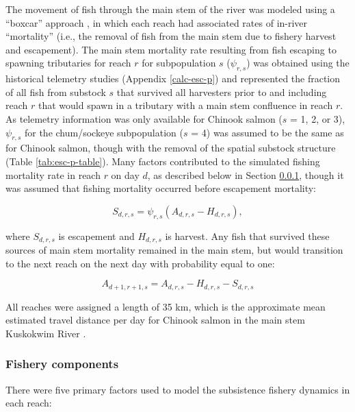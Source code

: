 \documentclass[12pt,]{book}
\theoremstyle{definition}
\theoremstyle{definition}
\theoremstyle{definition}
\theoremstyle{remark}
\begin{document}
The movement of fish through the main stem of the river was modeled
using a ``boxcar'' approach \citep{walters-martell-2004}, in which each
reach had associated rates of in-river ``mortality'' (i.e., the removal
of fish from the main stem due to fishery harvest and escapement). The
main stem mortality rate resulting from fish escaping to spawning
tributaries for reach \(r\) for subpopulation \(s\) (\(\psi_{r,s}\)) was
obtained using the historical telemetry studies (Appendix
\ref{calc-esc-p}) and represented the fraction of all fish from substock
\(s\) that survived all harvesters prior to and including reach \(r\)
that would spawn in a tributary with a main stem confluence in reach
\(r\). As telemetry information was only available for Chinook salmon
(\(s\) = 1, 2, or 3), \(\psi_{r,s}\) for the chum/sockeye subpopulation
(\(s\) = 4) was assumed to be the same as for Chinook salmon, though
with the removal of the spatial substock structure (Table
\ref{tab:esc-p-table}). Many factors contributed to the simulated
fishing mortality rate in reach \(r\) on day \(d\), as described below
in Section \ref{om-fishery}, though it was assumed that fishing
mortality occurred before escapement mortality:

\begin{equation}
  S_{d,r,s}=\psi_{r,s} \left(A_{d,r,s} - H_{d,r,s} \right),
  \label{eq:get-esc}
\end{equation}

\noindent
where \(S_{d,r,s}\) is escapement and \(H_{d,r,s}\) is harvest. Any fish
that survived these sources of main stem mortality remained in the main
stem, but would transition to the next reach on the next day with
probability equal to one:

\begin{equation}
  A_{d+1,r+1,s}=A_{d,r,s}-H_{d,r,s}-S_{d,r,s}
  \label{eq:move-fish}
\end{equation}

\noindent
All reaches were assigned a length of 35 km, which is the approximate
mean estimated travel distance per day for Chinook salmon in the main
stem Kuskokwim River \citep{smith-liller-2017a, smith-liller-2017b}.

\subsubsection{Fishery components}\label{om-fishery}

\noindent
There were five primary factors used to model the subsistence fishery
dynamics in each reach:
\end{document}

